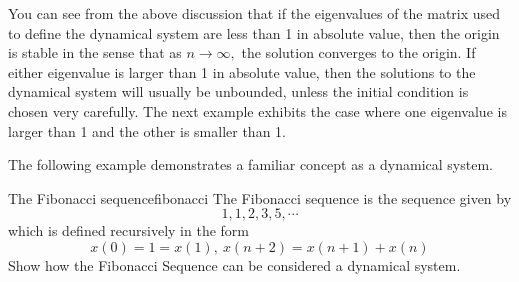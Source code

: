 You can see from the above discussion that if the eigenvalues of the matrix
used to define the dynamical system are less than 1 in absolute value, then
the origin is stable in the sense that as $n\rightarrow \infty ,$ the
solution converges to the origin. If either eigenvalue is larger than 1 in
absolute value, then the solutions to the dynamical system will usually be
unbounded, unless the initial condition is chosen very carefully. The next
example exhibits the case where one eigenvalue is larger than 1 and the
other is smaller than 1.

The following example demonstrates a familiar concept as a dynamical system.

\begin{example}{The Fibonacci sequence}{fibonacci}
The Fibonacci sequence is the sequence given by 
\begin{equation*}
1, 1, 2, 3, 5, \cdots
\end{equation*}
which is defined recursively in the
form
\begin{equation*}
x\left( 0\right) =1=x\left( 1\right) ,\ x\left( n+2\right) =x\left(
n+1\right) +x\left( n\right)
\end{equation*}
Show how the Fibonacci Sequence can be considered a dynamical system.
\end{example}

